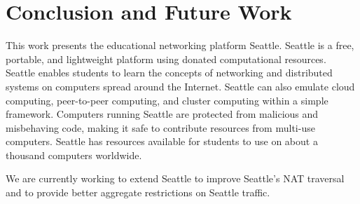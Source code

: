 \section{Conclusion and Future Work}
\label{sec-conclusion}
This work presents the educational networking platform Seattle. Seattle is a
free, portable, and lightweight platform using donated computational
resources. Seattle enables students to learn the concepts of networking and
distributed systems on computers spread around the Internet.   Seattle
can also emulate cloud computing, peer-to-peer computing, and cluster 
computing within a simple framework.   Computers running Seattle are protected 
from malicious and misbehaving code, making it safe to contribute
resources from multi-use computers.
Seattle has resources available for students to use on about a thousand 
computers worldwide.

We are currently working to extend Seattle to improve Seattle's NAT 
traversal and to provide better aggregate restrictions on Seattle traffic.

